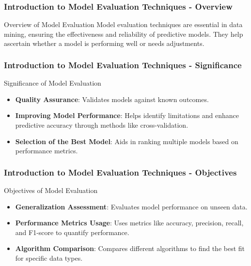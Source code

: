\documentclass[aspectratio=169]{beamer}
\begin{document}
\frame{\titlepage}

\begin{frame}[fragile]
    \frametitle{Introduction to Model Evaluation Techniques - Overview}
    \begin{block}{Overview of Model Evaluation}
        Model evaluation techniques are essential in data mining, ensuring the effectiveness and reliability of predictive models. They help ascertain whether a model is performing well or needs adjustments.
    \end{block}
\end{frame}

\begin{frame}[fragile]
    \frametitle{Introduction to Model Evaluation Techniques - Significance}
    \begin{block}{Significance of Model Evaluation}
        \begin{itemize}
            \item \textbf{Quality Assurance}: Validates models against known outcomes.
            \item \textbf{Improving Model Performance}: Helps identify limitations and enhance predictive accuracy through methods like cross-validation.
            \item \textbf{Selection of the Best Model}: Aids in ranking multiple models based on performance metrics.
        \end{itemize}
    \end{block}
\end{frame}

\begin{frame}[fragile]
    \frametitle{Introduction to Model Evaluation Techniques - Objectives}
    \begin{block}{Objectives of Model Evaluation}
        \begin{itemize}
            \item \textbf{Generalization Assessment}: Evaluates model performance on unseen data.
            \item \textbf{Performance Metrics Usage}: Uses metrics like accuracy, precision, recall, and F1-score to quantify performance.
            \item \textbf{Algorithm Comparison}: Compares different algorithms to find the best fit for specific data types.
        \end{itemize}
    \end{block}
\end{frame}
\end{document}
